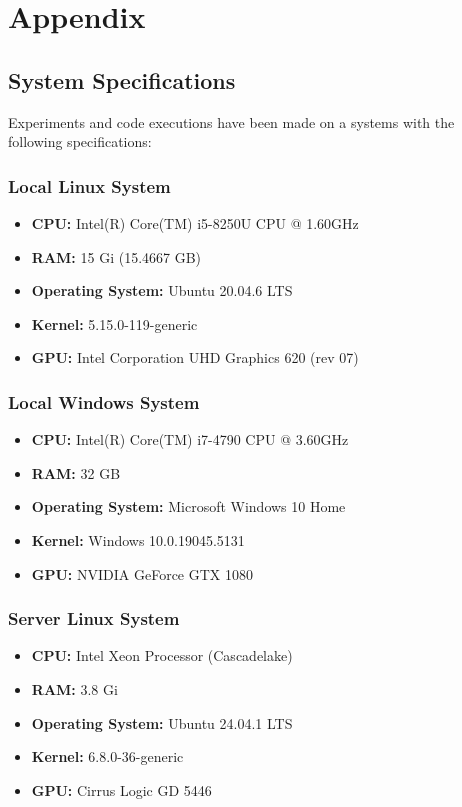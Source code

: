 \chapter{Appendix}
\label{ch:appendix}

\section{System Specifications}
Experiments and code executions have been made on a systems with the following specifications:

\subsection{Local Linux System}
\label{app:system:mymachine}
\begin{itemize}
    \item \textbf{CPU:} Intel(R) Core(TM) i5-8250U CPU @ 1.60GHz
    \item \textbf{RAM:} 15 Gi (15.4667 GB)
    \item \textbf{Operating System:} Ubuntu 20.04.6 LTS
    \item \textbf{Kernel:} 5.15.0-119-generic
    \item \textbf{GPU:} Intel Corporation UHD Graphics 620 (rev 07)
\end{itemize}

\subsection{Local Windows System}
\label{app:system:mypc}
\begin{itemize}
    \item \textbf{CPU:} Intel(R) Core(TM) i7-4790 CPU @ 3.60GHz
    \item \textbf{RAM:} 32 GB
    \item \textbf{Operating System:} Microsoft Windows 10 Home
    \item \textbf{Kernel:} Windows 10.0.19045.5131
    \item \textbf{GPU:} NVIDIA GeForce GTX 1080
\end{itemize}

\subsection{Server Linux System}
\label{app:system:server}
\begin{itemize}
    \item \textbf{CPU:} Intel Xeon Processor (Cascadelake)
    \item \textbf{RAM:} 3.8 Gi
    \item \textbf{Operating System:} Ubuntu 24.04.1 LTS
    \item \textbf{Kernel:} 6.8.0-36-generic
    \item \textbf{GPU:} Cirrus Logic GD 5446
\end{itemize}

